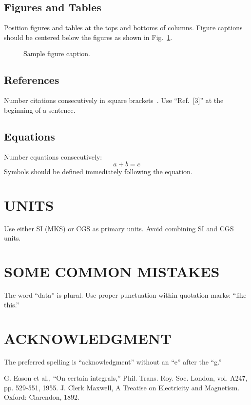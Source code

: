 \documentclass[conference]{IEEEtran}
\begin{document}
\subsection{Figures and Tables}
Position figures and tables at the tops and bottoms of columns. Figure captions should be centered below the figures as shown in Fig.~\ref{fig:sample}.

\begin{figure}[ht]
\centering
\caption{Sample figure caption.}
\label{fig:sample}
\end{figure}

\subsection{References}
Number citations consecutively in square brackets~\cite{ref1}. Use ``Ref.~[3]'' at the beginning of a sentence. 

\subsection{Equations}
Number equations consecutively:
\begin{equation}
a + b = c
\end{equation}
Symbols should be defined immediately following the equation.

\section{UNITS}
Use either SI (MKS) or CGS as primary units. Avoid combining SI and CGS units.

\section{SOME COMMON MISTAKES}
The word ``data'' is plural. Use proper punctuation within quotation marks: ``like this.'' 

\section*{ACKNOWLEDGMENT}
The preferred spelling is ``acknowledgment'' without an ``e'' after the ``g.''

\balance %

\begin{thebibliography}{9}
 G. Eason et al., ``On certain integrals,'' Phil. Trans. Roy. Soc. London, vol. A247, pp. 529-551, 1955.
 J. Clerk Maxwell, A Treatise on Electricity and Magnetism. Oxford: Clarendon, 1892.
\end{thebibliography}
\end{document}
